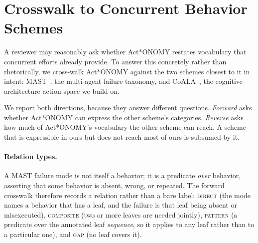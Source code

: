 
\section{Crosswalk to Concurrent Behavior Schemes}
\label{app:crosswalk}

A reviewer may reasonably ask whether Act*ONOMY restates
vocabulary that concurrent efforts already provide. To answer this
concretely rather than rhetorically, we cross-walk Act*ONOMY
against the two schemes closest to it in intent: MAST~\cite{cemri2025why},
the multi-agent failure taxonomy, and CoALA~\cite{sumers2024cognitive}, the
cognitive-architecture action space we build on.

We report both directions, because they answer different questions.
\emph{Forward} asks whether Act*ONOMY can express the other
scheme's categories. \emph{Reverse} asks how much of Act*ONOMY's
vocabulary the other scheme can reach. A scheme that is expressible in ours
but does not reach most of ours is subsumed by it.

\paragraph{Relation types.}
A MAST failure mode is not itself a behavior; it is a predicate \emph{over}
behavior, asserting that some behavior is absent, wrong, or repeated. The
forward crosswalk therefore records a relation rather than a bare label:
\textsc{direct} (the mode names a behavior that has a leaf, and the failure is
that leaf being absent or misexecuted), \textsc{composite} (two or more leaves
are needed jointly), \textsc{pattern} (a predicate over the annotated leaf
\emph{sequence}, so it applies to any leaf rather than to a particular one),
and \textsc{gap} (no leaf covers it).

